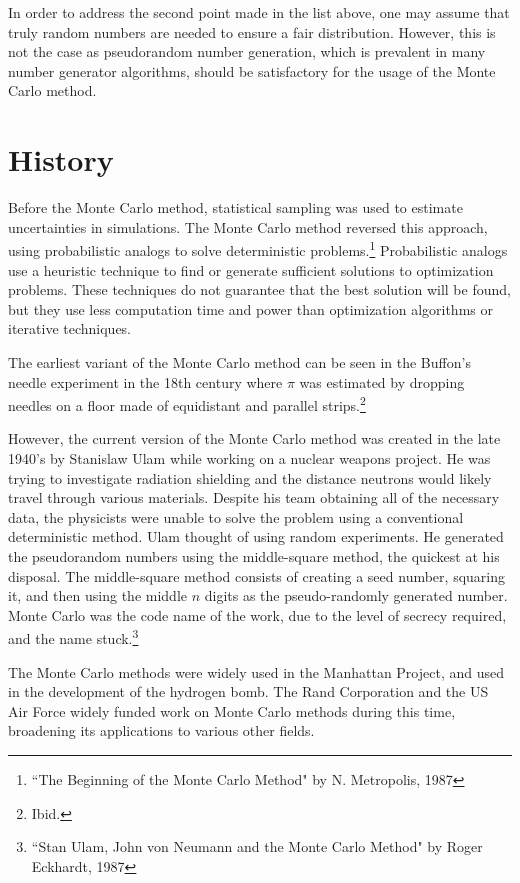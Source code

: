 \documentclass[10pt, letterpaper]{article}
\begin{document}
  In order to address the second point made in the list above, one may assume that truly random numbers are needed to ensure a fair distribution.
  However, this is not the case as pseudorandom number generation, which is prevalent in many number generator algorithms, should be satisfactory
  for the usage of the Monte Carlo method.

  \section{History}

  Before the Monte Carlo method, statistical sampling was used to estimate uncertainties in simulations. The Monte Carlo method
  reversed this approach, using probabilistic analogs to solve deterministic problems.\footnote{``The Beginning of the Monte Carlo Method" by N. Metropolis, 1987}
  Probabilistic analogs use a heuristic technique to find or generate sufficient solutions to optimization problems. These techniques
  do not guarantee that the best solution will be found, but they use less computation time and power than optimization algorithms or
  iterative techniques.

  The earliest variant of the Monte Carlo method can be seen in the Buffon's needle experiment in the 18th century where $\pi$ was estimated
  by dropping needles on a floor made of equidistant and parallel strips.\footnote{Ibid.}

  However, the current version of the Monte Carlo method was created in the late 1940's by Stanislaw Ulam while working on
  a nuclear weapons project. He was trying to investigate radiation shielding and the distance neutrons would likely travel through various
  materials. Despite his team obtaining all of the necessary data, the physicists were unable to solve the problem using a conventional deterministic
  method. Ulam thought of using random experiments. He generated the pseudorandom numbers using the middle-square method, the quickest at his
  disposal. The middle-square method consists of creating a seed number, squaring it, and then using the middle $n$ digits as the pseudo-randomly
  generated number. Monte Carlo was the code name of the work, due to the level of secrecy required, and the name stuck.\footnote{``Stan Ulam, John von
  Neumann and the Monte Carlo Method" by Roger Eckhardt, 1987}

  The Monte Carlo methods were widely used in the Manhattan Project, and used in the development of the hydrogen bomb. The Rand Corporation
  and the US Air Force widely funded work on Monte Carlo methods during this time, broadening its applications to various other fields.
\end{document}
